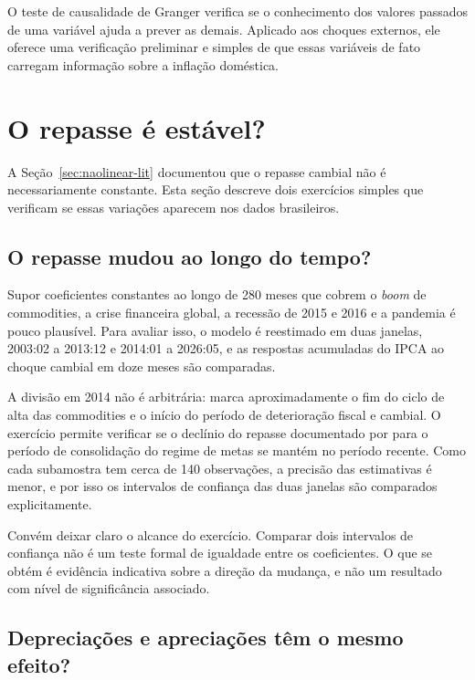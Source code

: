 \documentclass[12pt,openright,oneside,a4paper,portuguese,brazil]{abntex2}
\begin{document}
O teste de causalidade de Granger verifica se o conhecimento dos valores
passados de uma variável ajuda a prever as demais. Aplicado aos choques
externos, ele oferece uma verificação preliminar e simples de que essas
variáveis de fato carregam informação sobre a inflação doméstica.

\section{O repasse é estável?}
\label{sec:estabilidade}

A Seção~\ref{sec:naolinear-lit} documentou que o repasse cambial não é
necessariamente constante. Esta seção descreve dois exercícios simples que
verificam se essas variações aparecem nos dados brasileiros.

\subsection{O repasse mudou ao longo do tempo?}

Supor coeficientes constantes ao longo de 280 meses que cobrem o \textit{boom}
de commodities, a crise financeira global, a recessão de 2015 e 2016 e a
pandemia é pouco plausível. Para avaliar isso, o modelo é
reestimado em duas janelas, 2003:02 a 2013:12 e 2014:01 a 2026:05, e as
respostas acumuladas do IPCA ao choque cambial em doze meses são comparadas.

A divisão em 2014 não é arbitrária: marca aproximadamente o fim do ciclo de
alta das commodities e o início do período de deterioração fiscal e cambial. O
exercício permite verificar se o declínio do repasse documentado por
 para o período de consolidação do regime de metas
se mantém no período recente. Como cada subamostra tem cerca de 140 observações, a precisão das estimativas
é menor, e por isso os intervalos de confiança das duas janelas são comparados
explicitamente.

Convém deixar claro o alcance do exercício. Comparar dois intervalos de
confiança não é um teste formal de igualdade entre os coeficientes. O que se
obtém é evidência indicativa sobre a direção da mudança, e não um resultado
com nível de significância associado.

\subsection{Depreciações e apreciações têm o mesmo efeito?}
\end{document}
